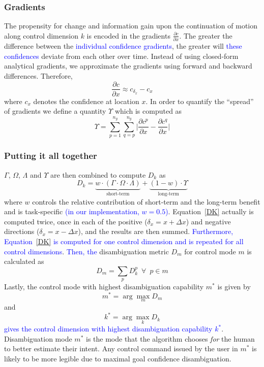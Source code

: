 \documentclass[conference]{IEEEtran}
\newcommand{\argmax}{\arg\!\max}
\begin{document}
\subsubsection{Gradients}\label{COMP4}
The propensity for change and information gain upon the continuation of motion along control dimension $k$ is encoded in the gradients $\frac{\partial c}{\partial x}$. The greater the difference between the \textcolor{blue}{individual confidence gradients}, the greater will \textcolor{blue}{these confidences} deviate from each other over time.  Instead of using closed-form analytical gradients, we approximate the gradients using forward and backward differences. Therefore, 
\begin{equation*}
\frac{\partial c}{\partial x} \approx c_{\delta_x} - c_{x} 
\end{equation*}
where $c_x$ denotes the confidence at location $x$.
In order to quantify the ``spread'' of gradients we define a quantity $\Upsilon$ which is computed as 
\begin{equation*}
\Upsilon = \sum_{p=1}^{n_g}\sum_{q=p}^{n_g}\Big \lvert\frac{\partial c^p}{\partial x} - \frac{\partial c^q}{\partial x}\Big \rvert
\end{equation*}
\subsubsection*{Putting it all together}
$\Gamma$, $\Omega$, $\Lambda$ and $\Upsilon$ are then combined to compute $D_{k}$ as 
\begin{equation}\label{DK}
D_{k} = \underbrace{w\cdot(\Gamma\cdot \Omega\cdot\Lambda)}_{\text{short-term}} + \underbrace{(1 - w)\cdot \Upsilon}_{\text{long-term}}
\end{equation}
where $w$ controls the relative contribution of short-term and the long-term benefit and is task-specific \textcolor{blue}{(in our implementation, $w=0.5$)}. Equation~\ref{DK} actually is computed twice, once in each of the positive ($\delta_x = x + \Delta x$) and negative directions ($\delta_x = x - \Delta x$), and the results are then summed. \textcolor{blue}{Furthermore, Equation~\ref{DK} is computed for one control dimension and is repeated for all control dimensions}. \textcolor{blue}{Then, the} disambiguation metric $D_m$ for control mode $m$ is calculated as 
\begin{equation*}
D_m = \sum_{p} D_{k}^{p} \;~ \forall \;~ p \in m
\end{equation*}
Lastly, the control mode with highest disambiguation capability $m^*$ is given by
\begin{equation*}
m^* = \argmax_m  D_{m}
\end{equation*}
and
\begin{equation*}
k^* = \argmax_k D_k
\end{equation*}
\textcolor{blue}{gives the control dimension with highest disambiguation capability $k^{*}$}.
Disambiguation mode $m^{*}$ is the mode that the algorithm chooses \textit{for} the human to better estimate their intent. Any control command issued by the user in $m^*$ is likely to be more legible due to maximal goal confidence disambiguation.
\end{document}
